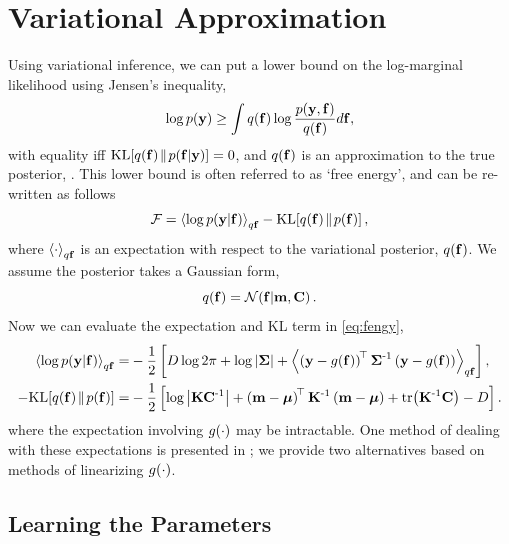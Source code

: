 \documentclass{article} %
\begin{document}
\section{Variational Approximation}

Using variational inference, we can put a lower bound on the log-marginal
likelihood using Jensen's inequality, 
\begin{equation}
    \log p\!\left({\mathbf{y}}\right) \geq \int q\!\left({\mathbf{f}}\right) \log 
        \frac{p\!\left({\mathbf{y}, \mathbf{f}}\right)}{q\!\left({\mathbf{f}}\right)} d\mathbf{f},
\end{equation}
with equality iff $\text{KL}\!\left[{{q\!\left({\mathbf{f}}\right)}\!\parallel\!{p\!\left({\mathbf{f}}\middle\vert{\ensuremath{\mathbf{y}}}\right)}}\right] = 0$, and
$q\!\left({\mathbf{f}}\right)$ is an approximation to the true posterior,
\probC{\lstate}{\obs}. This lower bound is often referred to as `free energy',
and can be re-written as follows
\begin{equation}
    \mathcal{F} = \left\langle{\log \ensuremath{p\!\left({\mathbf{y}}\middle\vert{\ensuremath{\mathbf{f}}}\right)}}\right\rangle_{q\mathbf{f}}
        - \text{KL}\!\left[{{q\!\left({\mathbf{f}}\right)}\!\parallel\!{p\!\left({\mathbf{f}}\right)}}\right],
    \label{eq:fengy}
\end{equation}
where $\left\langle{\cdot}\right\rangle_{q\mathbf{f}}$ is an expectation with respect to the
variational posterior, $q\!\left({\mathbf{f}}\right)$. We assume the posterior takes a
Gaussian form,
\begin{equation}
    q\!\left({\mathbf{f}}\right) = \mathcal{N}\!\left({\mathbf{f}}\middle\vert{\ensuremath{\mathbf{m}}, \ensuremath{\mathbf{C}}}\right). \label{eq:varpost}
\end{equation}
Now we can evaluate the expectation and KL term in \eqref{eq:fengy},
\begin{align}
    \expec{q\lstate}{\log \probC{\obs}{\lstate}}
        =& - \frac{1}{2} \sbrac{ 
            D\log{2\pi} + \log\deter{\lcov} 
            + \expec{q\lstate}{\brac{\obs - \nonlin{\lstate}}\transpose\lcov\inv
            \brac{\obs - \nonlin{\lstate}}}},
            \label{eq:qlike} \\
     - \KL{\qrob{\lstate}}{\prob{\lstate}}
        =& - \frac{1}{2} \sbrac{\log\deter{\prcov\pocov\inv}
            + \brac{\pomean - \prmean}\transpose\prcov\inv
            \brac{\pomean - \prmean}
            + \trace{\prcov\inv\pocov} - D } \label{eq:qkl}.
\end{align}
where the expectation involving $g\!\left({{\cdot}}\right)$ may be intractable. One method
of dealing with these expectations is presented in \cite{Opper2009}; we provide
two alternatives based on methods of linearizing $g\!\left({{\cdot}}\right)$.


\subsection{Learning the Parameters}
\end{document}
